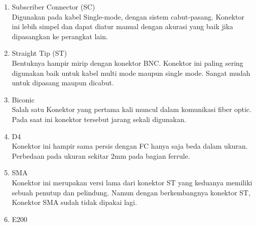 \begin{flushleft}
\begin{enumerate}
\item Subscriber Connector (SC) \\ Digunakan pada kabel Single-mode, dengan sistem cabut-pasang. Konektor ini lebih simpel dan dapat diatur manual dengan akurasi yang baik jika dipasangkan ke perangkat lain.
\item Straight Tip (ST) \\ Bentuknya hampir mirip dengan konektor BNC. Konektor ini paling sering digunakan baik untuk kabel multi mode maupun single mode. Sangat mudah untuk dipasang maupun dicabut.
\item Biconic \\ Salah satu Konektor yang pertama kali muncul dalam komunikasi fiber optic. Pada saat ini konektor tersebut jarang sekali digunakan.
\item D4 \\ Konektor ini hampir sama persis dengan FC hanya saja beda dalam ukuran. Perbedaan pada ukuran sekitar 2mm pada bagian ferrule.
\item SMA \\ Konektor ini merupakan versi lama dari konektor ST yang keduanya memiliki sebuah penutup dan pelindung. Namun dengan berkembangnya konektor ST, Konektor SMA sudah tidak dipakai lagi.
\item E200
\end{enumerate}
\end{flushleft}
